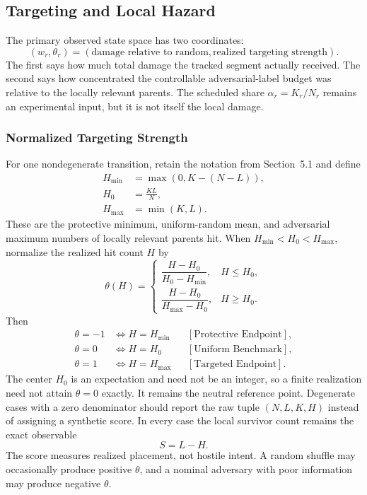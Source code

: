 \subsection{Targeting and Local Hazard}
The primary observed state space has two coordinates:
\begin{equation*}
(w_r,\theta_r)
=
(\text{damage relative to random},\text{realized targeting strength}).
\end{equation*}
The first says how much total damage the tracked segment actually received. The second says how concentrated the controllable adversarial-label budget was relative to the locally relevant parents. The scheduled share $\alpha_r=K_r/N_r$ remains an experimental input, but it is not itself the local damage.
\subsubsection*{Normalized Targeting Strength}
For one nondegenerate transition, retain the notation from Section~5.1 and define
\begin{equation*}
\begin{aligned}
H_{\min}&=\max(0,K-(N-L)),\\
H_0&=\frac{KL}{N},\\
H_{\max}&=\min(K,L).
\end{aligned}
\end{equation*}
These are the protective minimum, uniform-random mean, and adversarial maximum numbers of locally relevant parents hit. When $H_{\min} < H_0 < H_{\max}$, normalize the realized hit count $H$ by
\begin{equation*}
\theta(H)=
\begin{cases}
\dfrac{H-H_0}{H_0-H_{\min}},&H\le H_0,\\[8pt]
\dfrac{H-H_0}{H_{\max}-H_0},&H\ge H_0.
\end{cases}
\end{equation*}
Then
\begin{equation*}
\begin{aligned}
\theta=-1&\Longleftrightarrow H=H_{\min}
&&[\text{Protective Endpoint}],\\
\theta=0&\Longleftrightarrow H=H_0
&&[\text{Uniform Benchmark}],\\
\theta=1&\Longleftrightarrow H=H_{\max}
&&[\text{Targeted Endpoint}].
\end{aligned}
\end{equation*}
The center $H_0$ is an expectation and need not be an integer, so a finite realization need not attain $\theta=0$ exactly. It remains the neutral reference point.
Degenerate cases with a zero denominator should report the raw tuple $(N,L,K,H)$ instead of assigning a synthetic score. In every case the local survivor count remains the exact observable
\begin{equation*}
S=L-H.
\end{equation*}
The score measures realized placement, not hostile intent. A random shuffle may occasionally produce positive $\theta$, and a nominal adversary with poor information may produce negative $\theta$.
